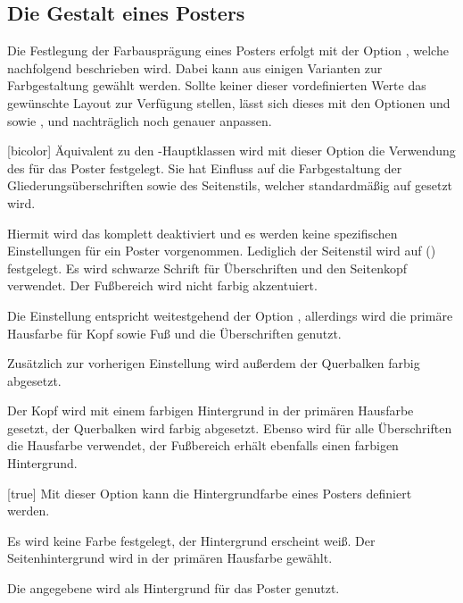\begin{Bundle*}{}
\subsection{Die Gestalt eines Posters}

Die Festlegung der Farbausprägung eines Posters erfolgt mit der Option 
, welche nachfolgend beschrieben wird. Dabei kann aus einigen 
Varianten zur Farbgestaltung gewählt werden. Sollte keiner dieser 
vordefinierten Werte das gewünschte Layout zur Verfügung stellen, lässt sich 
dieses mit den Optionen  und  sowie 
,  und  nachträglich 
noch genauer anpassen.


\begin{Declaration}{}[bicolor]
\printdeclarationlist%
%
Äquivalent zu den \TUDScript-Hauptklassen wird mit dieser Option die Verwendung 
des \TUDCDs für das Poster festgelegt. Sie hat Einfluss auf die Farbgestaltung 
der Gliederungsüberschriften sowie des Seitenstils, welcher standardmäßig auf 
 gesetzt wird.
%
\begin{values}{}
\itemfalse
  Hiermit wird das \CD komplett deaktiviert und es werden keine spezifischen 
  Einstellungen für ein Poster vorgenommen. Lediglich der Seitenstil wird auf 
  () festgelegt.
  Es wird schwarze Schrift für Überschriften und den Seitenkopf verwendet. Der 
  Fußbereich wird nicht farbig akzentuiert.
\item[lightcolor/pale]
  Die Einstellung entspricht weitestgehend der Option , 
  allerdings wird die primäre Hausfarbe  für Kopf sowie Fuß und 
  die Überschriften genutzt.
\item[barcolor]
  Zusätzlich zur vorherigen Einstellung wird außerdem der Querbalken farbig 
  abgesetzt.
\item[bicolor/color/fullcolor]
  Der Kopf wird mit einem farbigen Hintergrund in der primären Hausfarbe 
   gesetzt, der Querbalken wird farbig abgesetzt. Ebenso wird für 
  alle Überschriften die Hausfarbe verwendet, der Fußbereich erhält ebenfalls 
  einen farbigen Hintergrund.
\end{values}
\end{Declaration}

\begin{Declaration}{}[true]
\printdeclarationlist%
%
Mit dieser Option kann die Hintergrundfarbe eines Posters definiert werden.
%
\begin{values}{}
\itemfalse[nocolor]
  Es wird keine Farbe festgelegt, der Hintergrund erscheint weiß.
\itemtrue*[color]
  Der Seitenhintergrund wird in der primären Hausfarbe  gewählt.
\item[\PName{Farbe}]
  Die angegebene  wird als Hintergrund für das Poster genutzt.
\end{values}
\end{Declaration}


\end{Bundle*}
